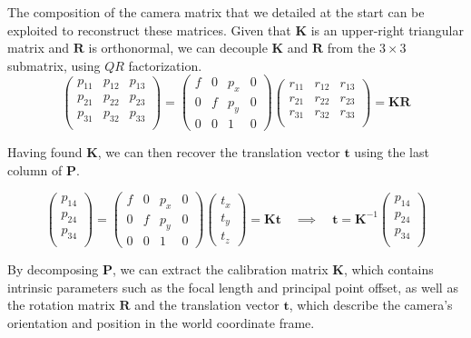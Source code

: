 \documentclass[12pt]{article}
\begin{document}
The composition of the camera matrix that we detailed at the start can be exploited to reconstruct these matrices. Given that $\mathbf{K}$ is an upper-right triangular matrix and $\mathbf{R}$ is orthonormal, we can decouple $\mathbf{K}$ and $\mathbf{R}$ from the $3\times 3$ submatrix, using $QR$ factorization.
$$
\begin{pmatrix}
    p_{11} & p_{12} & p_{13} \\
    p_{21} & p_{22} & p_{23} \\
    p_{31} & p_{32} & p_{33} \\
\end{pmatrix} = 
\begin{pmatrix}
    f & 0 & p_x & 0 \\
    0 & f & p_y & 0 \\
    0 & 0 & 1 & 0
\end{pmatrix}
\begin{pmatrix}
    r_{11} & r_{12} & r_{13} \\
    r_{21} & r_{22} & r_{23} \\
    r_{31} & r_{32} & r_{33} \\
\end{pmatrix}
= \mathbf{KR}
$$

Having found $\mathbf{K}$, we can then recover the translation vector $\mathbf{t}$ using the last column of $\mathbf{P}$.

$$
\begin{pmatrix}
    p_{14} \\ p_{24} \\ p_{34} \\
\end{pmatrix} = 
\begin{pmatrix}
    f & 0 & p_x & 0 \\
    0 & f & p_y & 0 \\
    0 & 0 & 1 & 0
\end{pmatrix}
\begin{pmatrix}
    t_x \\ t_y \\ t_z
\end{pmatrix}
= \mathbf{Kt}
\quad\implies\quad
\mathbf{t} = \mathbf{K}^{-1}
\begin{pmatrix}
    p_{14} \\ p_{24} \\ p_{34} \\
\end{pmatrix}
$$

By decomposing \( \mathbf{P} \), we can extract the calibration matrix \( \mathbf{K} \), which contains intrinsic parameters such as the focal length and principal point offset, as well as the rotation matrix \( \mathbf{R} \) and the translation vector \( \mathbf{t} \), which describe the camera’s orientation and position in the world coordinate frame.
\end{document}
